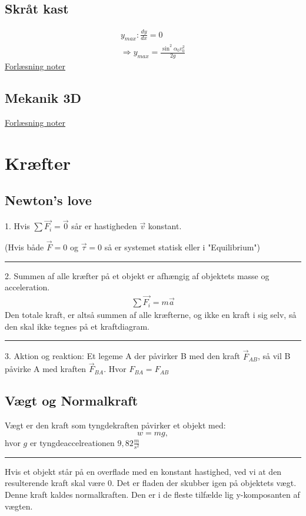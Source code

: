\documentclass[a4paper,oneside,article]{memoir}
\begin{document}
\subsection{Skråt kast} \label{ssc:skråtkast}
\begin{align*}
    y_{max}: \frac{dy}{dx}=0 \\
    \Rightarrow y_{max} = \frac{\sin^2\alpha_0v_0^2}{2g}
\end{align*}
\hyperref[fig:Skråtkast1]{Forlæsning noter}

\subsection{Mekanik 3D} \label{ssc:mekanik3d}
\hyperref[fig:Mekanik3D1]{Forlæsning noter}

\section{Kræfter}
\subsection{Newton's love}
1. Hvis $\sum\Vec{F_i}=\Vec{0}$ sår er hastigheden $\Vec{v}$ konstant. 

(Hvis både $\Vec{F}=0$ og $\Vec{\tau}=0$ så er systemet statisk eller i "Equilibrium")
\plainbreak{1}
2. Summen af alle kræfter på et objekt er afhængig af objektets masse og acceleration. 
\begin{align*}
    \sum\Vec{F_i}=m\Vec{a}
\end{align*}
Den totale kraft, er altså summen af alle kræfterne, og ikke en kraft i sig selv, så den skal ikke tegnes på et kraftdiagram. 
\plainbreak{1}
3. Aktion og reaktion: Et legeme A der påvirker B med den kraft $\Vec{F}_{AB}$, så vil B påvirke A med kraften $\Vec{F}_{BA}$. Hvor $F_{BA}=F_{AB}$

\subsection{Vægt og Normalkraft} \label{scc:vægt} \label{scc:normalkraft}
Vægt er den kraft som tyngdekraften påvirker et objekt med: \[w=mg,\] hvor $g$ er tyngdeaccelreationen $9,82 \frac{m}{s^2}$
\plainbreak{1}
Hvis et objekt står på en overflade med en konstant hastighed, ved vi at den resulterende kraft skal være 0. Det er fladen der skubber igen på objektets vægt. Denne kraft kaldes normalkraften. Den er i de fleste tilfælde lig y-komposanten af vægten. 
\end{document}
